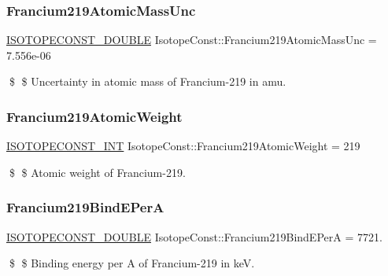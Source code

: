 \subsubsection{\texorpdfstring{Francium219\+Atomic\+Mass\+Unc}{Francium219AtomicMassUnc}}
{\footnotesize\ttfamily \mbox{\hyperlink{group___isotope_const-_macros_ga8f45a7272ce02c0b4c65c44636ed719a}{I\+S\+O\+T\+O\+P\+E\+C\+O\+N\+S\+T\+\_\+\+D\+O\+U\+B\+LE}} Isotope\+Const\+::\+Francium219\+Atomic\+Mass\+Unc = 7.\+556e-\/06}

\$ \$ Uncertainty in atomic mass of Francium-\/219 in amu. \mbox{\label{group___isotope_const-_francium-_fr219_ga0cc254655ad92ba888193aaf0dcabc99}} 
\subsubsection{\texorpdfstring{Francium219\+Atomic\+Weight}{Francium219AtomicWeight}}
{\footnotesize\ttfamily \mbox{\hyperlink{group___isotope_const-_macros_ga5f18360b3e99483a35c32d789e62621c}{I\+S\+O\+T\+O\+P\+E\+C\+O\+N\+S\+T\+\_\+\+I\+NT}} Isotope\+Const\+::\+Francium219\+Atomic\+Weight = 219}

\$ \$ Atomic weight of Francium-\/219. \mbox{\label{group___isotope_const-_francium-_fr219_gae299793654c3dc8d939fd3f4e03aa927}} 
\subsubsection{\texorpdfstring{Francium219\+Bind\+E\+PerA}{Francium219BindEPerA}}
{\footnotesize\ttfamily \mbox{\hyperlink{group___isotope_const-_macros_ga8f45a7272ce02c0b4c65c44636ed719a}{I\+S\+O\+T\+O\+P\+E\+C\+O\+N\+S\+T\+\_\+\+D\+O\+U\+B\+LE}} Isotope\+Const\+::\+Francium219\+Bind\+E\+PerA = 7721.}

\$ \$ Binding energy per A of Francium-\/219 in keV. \mbox{\label{group___isotope_const-_francium-_fr219_gae9e3b7385b93eeb6f3405858bf65ad03}} 
